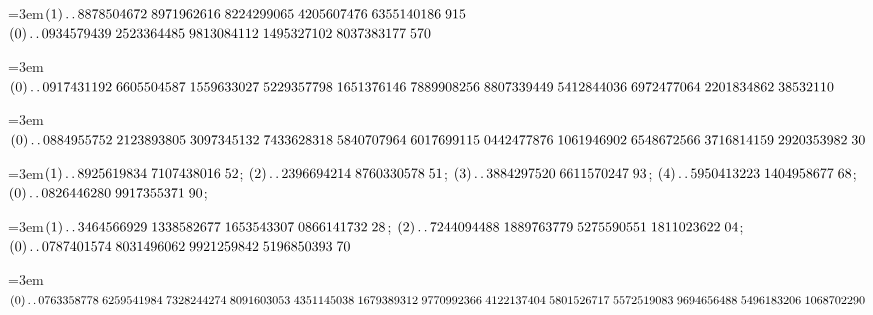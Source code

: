 %
\begingroup\raggedright{} 
\par\noindent\hangindent=3em\enspace $(1)\mathinner{.\,.}8878504672\;\allowbreak 8971962616\;\allowbreak 8224299065\;\allowbreak 4205607476\;\allowbreak 6355140186\;\allowbreak 915$ $(0)\mathinner{.\,.}0934579439\;\allowbreak 2523364485\;\allowbreak 9813084112\;\allowbreak 1495327102\;\allowbreak 8037383177\;\allowbreak 570$\par\smallskip

\par\noindent\hangindent=3em\enspace $(0)\mathinner{.\,.}0917431192\;\allowbreak 6605504587\;\allowbreak 1559633027\;\allowbreak 5229357798\;\allowbreak 1651376146\;\allowbreak 7889908256\;\allowbreak 8807339449\;\allowbreak 5412844036\;\allowbreak 6972477064\;\allowbreak 2201834862\;\allowbreak 38532110$\par\smallskip

\par\noindent\hangindent=3em\enspace $(0)\mathinner{.\,.}0884955752\;\allowbreak 2123893805\;\allowbreak 3097345132\;\allowbreak 7433628318\;\allowbreak 5840707964\;\allowbreak 6017699115\;\allowbreak 0442477876\;\allowbreak 1061946902\;\allowbreak 6548672566\;\allowbreak 3716814159\;\allowbreak 2920353982\;\allowbreak 30$\par\smallskip

\par\noindent\hangindent=3em\enspace $(1)\mathinner{.\,.}8925619834\;\allowbreak 7107438016\;\allowbreak 52$; $(2)\mathinner{.\,.}2396694214\;\allowbreak 8760330578\;\allowbreak 51$; $(3)\mathinner{.\,.}3884297520\;\allowbreak 6611570247\;\allowbreak 93$; $(4)\mathinner{.\,.}5950413223\;\allowbreak 1404958677\;\allowbreak 68$; $(0)\mathinner{.\,.}0826446280\;\allowbreak 9917355371\;\allowbreak 90$;\par\smallskip

\par\noindent\hangindent=3em\enspace $(1)\mathinner{.\,.}3464566929\;\allowbreak 1338582677\;\allowbreak 1653543307\;\allowbreak 0866141732\;\allowbreak 28$; $(2)\mathinner{.\,.}7244094488\;\allowbreak 1889763779\;\allowbreak 5275590551\;\allowbreak 1811023622\;\allowbreak 04$; $(0)\mathinner{.\,.}0787401574\;\allowbreak 8031496062\;\allowbreak 9921259842\;\allowbreak 5196850393\;\allowbreak 70$\par\smallskip

\par\noindent\hangindent=3em\enspace $(0)\mathinner{.\,.}0763358778\;\allowbreak 6259541984\;\allowbreak 7328244274\;\allowbreak 8091603053\;\allowbreak 4351145038\;\allowbreak 1679389312\;\allowbreak 9770992366\;\allowbreak 4122137404\;\allowbreak 5801526717\;\allowbreak 5572519083\;\allowbreak 9694656488\;\allowbreak 5496183206\;\allowbreak 1068702290$\par\smallskip


